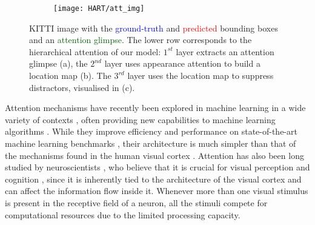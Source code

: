 \begin{figure}[ht!]
	\centering
	\begin{minipage}[c]{0.67\textwidth}
		\centering
        \begin{subfigure}[b]{1.\textwidth}
      		 \centering
             \texttt{[image: HART/att\_img]}
        \end{subfigure}
        \begin{minipage}{.85\textwidth}
        	\centering
            \begin{subfigure}[b]{.29\textwidth}
            \end{subfigure}
            \hfill
            \hspace{8pt}
            \begin{subfigure}[b]{.29\textwidth}
            \end{subfigure}
            \hfill
            \hspace{5pt}
            \begin{subfigure}[b]{.29\textwidth}
            \end{subfigure}
        \end{minipage}
	\end{minipage}
	\begin{minipage}[c]{0.2\textwidth}
   		\caption{KITTI image with the \textcolor{blue}{ground-truth} and \textcolor{red}{predicted} bounding boxes and an \textcolor{darkgreen}{attention glimpse}. The lower row corresponds to the hierarchical attention of our model: $1^{st}$ layer extracts an attention glimpse (a), the $2^{nd}$ layer uses appearance attention to build a location map (b). The $3^{rd}$ layer uses the location map to suppress distractors, visualised in (c).}
        \label{fig:img_with_att}
	\end{minipage}
\end{figure}
    Attention mechanisms have recently been explored in machine learning in a wide variety of contexts \cite{Vinyals2014, Jaderberg2015}, often providing new capabilities to machine learning algorithms \cite{Graves2016dnc,Gregor2016towards, Eslami2016air}. While they improve efficiency \cite{Graves2014recurrent} and performance on state-of-the-art machine learning benchmarks \cite{Vinyals2014}, their architecture is much simpler than that of the mechanisms found in the human visual cortex \cite{Dayan2001}. Attention has also been long studied by neuroscientists \cite{Ungerleider2000}, who believe that it is crucial for visual perception and cognition \cite{Olshausen2016foveal}, since it is inherently tied to the architecture of the visual cortex and can affect the information flow inside it. Whenever more than one visual stimulus is present in the receptive field of a neuron, all the stimuli compete for computational resources due to the limited processing capacity. 
